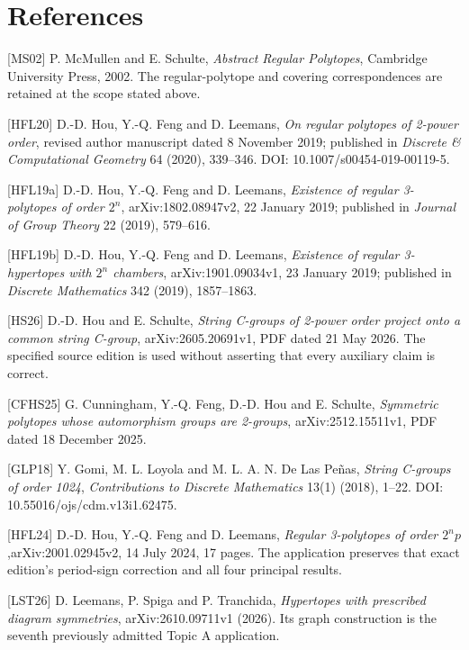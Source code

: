 \section*{References}
{[}MS02{]} P. McMullen and E. Schulte, \emph{Abstract Regular
Polytopes}, Cambridge University Press, 2002. The regular-polytope and
covering correspondences are retained at the scope stated above.

{[}HFL20{]} D.-D. Hou, Y.-Q. Feng and D. Leemans, \emph{On regular
polytopes of 2-power order}, revised author manuscript dated 8 November
2019; published in \emph{Discrete \& Computational Geometry} 64 (2020),
339--346. DOI: 10.1007/s00454-019-00119-5.

{[}HFL19a{]} D.-D. Hou, Y.-Q. Feng and D. Leemans, \emph{Existence of
regular 3-polytopes of order \(2^n\)}, arXiv:1802.08947v2, 22 January
2019; published in \emph{Journal of Group Theory} 22 (2019), 579--616.

{[}HFL19b{]} D.-D. Hou, Y.-Q. Feng and D. Leemans, \emph{Existence of
regular 3-hypertopes with \(2^n\) chambers}, arXiv:1901.09034v1, 23
January 2019; published in \emph{Discrete Mathematics} 342 (2019),
1857--1863.

{[}HS26{]} D.-D. Hou and E. Schulte, \emph{String C-groups of 2-power
order project onto a common string C-group}, arXiv:2605.20691v1, PDF
dated 21 May 2026. The specified source edition is used without
asserting that every auxiliary claim is correct.

{[}CFHS25{]} G. Cunningham, Y.-Q. Feng, D.-D. Hou and E. Schulte,
\emph{Symmetric polytopes whose automorphism groups are 2-groups},
arXiv:2512.15511v1, PDF dated 18 December 2025.

{[}GLP18{]} Y. Gomi, M. L. Loyola and M. L. A. N. De Las Peñas,
\emph{String C-groups of order 1024}, \emph{Contributions to Discrete
Mathematics} 13(1) (2018), 1--22. DOI: 10.55016/ojs/cdm.v13i1.62475.

{[}HFL24{]} D.-D. Hou, Y.-Q. Feng and D. Leemans,
\emph{Regular 3-polytopes of order $2^n p$},\hfill\break arXiv:2001.02945v2,
14 July 2024, 17 pages. The application preserves that exact edition's
period-sign correction and all four principal results.

{[}LST26{]} D. Leemans, P. Spiga and P. Tranchida,
\emph{Hypertopes with prescribed diagram symmetries},
arXiv:2610.09711v1 (2026). Its graph construction is the seventh
previously admitted Topic A application.


